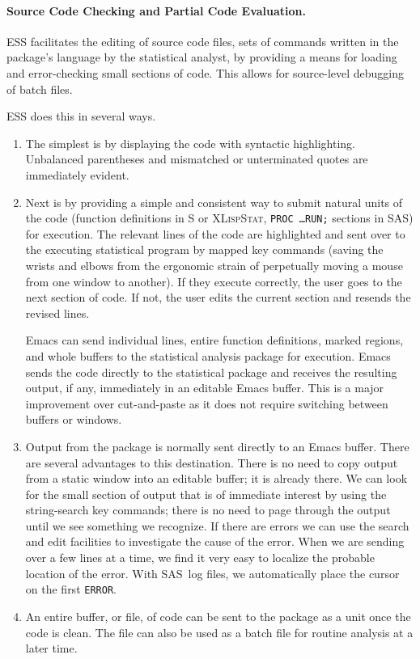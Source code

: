 \documentclass{article}
\newcommand*{\SAS}{\textsc{SAS}}
\newcommand*{\XLispStat}{\textsc{XLispStat}}
\newcommand{\stexttt}[1]{{\small\texttt{#1}}}
\begin{document}
\paragraph{Source Code Checking and Partial Code Evaluation.}

ESS facilitates the editing of source code files, sets of commands
written in the package's language by the statistical analyst, by
providing a means for loading and error-checking small sections of
code.  This allows for source-level debugging of batch files.

ESS does this in several ways.
\begin{enumerate}
\item The simplest is by displaying the code with syntactic highlighting.
Unbalanced parentheses and mismatched or unterminated quotes are immediately
evident.

\item Next is by providing a simple and consistent way to submit
natural units of the code (function definitions in S or \XLispStat,
\stexttt{PROC \dots RUN;} sections in \SAS) for execution.
The relevant lines of the code are highlighted and sent over to the
executing statistical program by mapped key commands (saving the wrists
and elbows from the ergonomic strain of perpetually moving a mouse from
one window to another).  If they execute correctly, the user goes to the
next section of code.  If not, the user edits the current section and resends
the revised lines.

Emacs can send individual lines, entire function definitions, marked
regions, and whole buffers to the statistical analysis package for
execution.  Emacs sends the code directly to
the statistical package and receives the resulting output, if any,
immediately in an editable Emacs buffer.
This is a major improvement over cut-and-paste as it does
not require switching between buffers or windows.

\item
Output from the package is normally sent directly to an Emacs buffer.
There are several advantages to this destination.
There is no need to copy output from a static window into an
editable buffer; it is already there.
We can look for the
small section of output that is of immediate interest by using the
string-search key commands; there is no need to page through the
output until we see something we recognize.
If there are errors we
can use the search and edit facilities to investigate the cause of the
error.  When we are sending over a few lines at a time, we find
it very easy to localize the probable location of the error.
With \SAS\ log files, we automatically place the cursor
on the first \stexttt{ERROR}.

\item
An entire buffer, or file, of code can be sent to the package as a unit
once the code is clean.  The file can also be used as a batch file for
routine analysis at a later time.

\end{enumerate}
\end{document}
